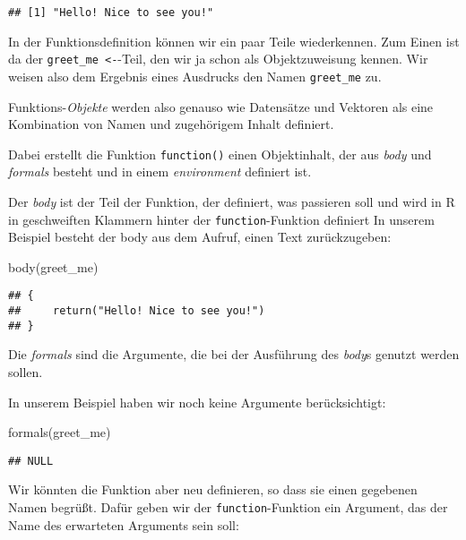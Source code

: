 \documentclass[
]{book}
\newenvironment{Shaded}{\begin{snugshade}}{\end{snugshade}}
\newcommand{\FunctionTok}[1]{\textcolor[rgb]{0.00,0.00,0.00}{#1}}
\newcommand{\NormalTok}[1]{#1}
\begin{document}
\begin{verbatim}
## [1] "Hello! Nice to see you!"
\end{verbatim}

In der Funktionsdefinition können wir ein paar Teile wiederkennen.
Zum Einen ist da der \texttt{greet\_me\ \textless{}-}-Teil, den wir ja schon als Objektzuweisung kennen. Wir weisen also dem Ergebnis eines Ausdrucks den Namen \texttt{greet\_me} zu.

Funktions-\emph{Objekte} werden also genauso wie Datensätze und Vektoren als eine Kombination von Namen und zugehörigem Inhalt definiert.

Dabei erstellt die Funktion \texttt{function()} einen Objektinhalt, der aus \emph{body} und \emph{formals} besteht und in einem \emph{environment} definiert ist.

Der \emph{body} ist der Teil der Funktion, der definiert, was passieren soll und wird in R in geschweiften Klammern hinter der \texttt{function}-Funktion definiert
In unserem Beispiel besteht der body aus dem Aufruf, einen Text zurückzugeben:

\begin{Shaded}
\begin{Highlighting}[]
\FunctionTok{body}\NormalTok{(greet\_me)}
\end{Highlighting}
\end{Shaded}

\begin{verbatim}
## {
##     return("Hello! Nice to see you!")
## }
\end{verbatim}

Die \emph{formals} sind die Argumente, die bei der Ausführung des \emph{body}s genutzt werden sollen.

In unserem Beispiel haben wir noch keine Argumente berücksichtigt:

\begin{Shaded}
\begin{Highlighting}[]
\FunctionTok{formals}\NormalTok{(greet\_me)}
\end{Highlighting}
\end{Shaded}

\begin{verbatim}
## NULL
\end{verbatim}

Wir könnten die Funktion aber neu definieren, so dass sie einen gegebenen Namen begrüßt. Dafür geben wir der \texttt{function}-Funktion ein Argument, das der Name des erwarteten Arguments sein soll:
\end{document}
